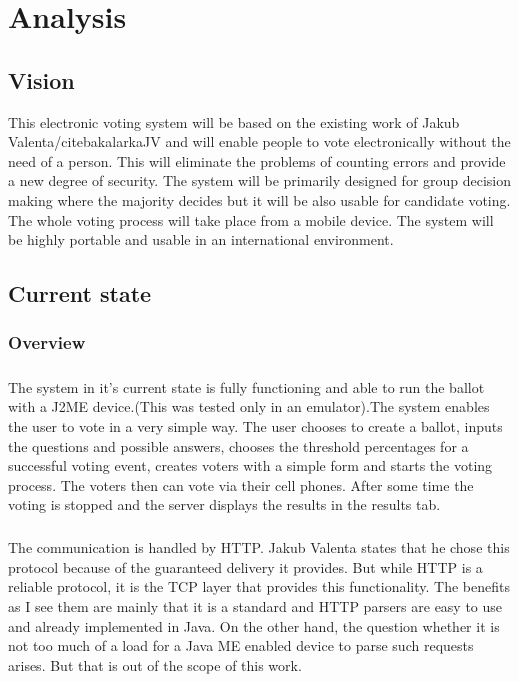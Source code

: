 \documentclass[11pt,twoside,a4paper]{book}
\begin{document}
\chapter{Analysis}
\section{Vision}
This electronic voting system will be based on the existing work of Jakub Valenta/cite{bakalarkaJV} and will enable people to vote electronically without the need of a person. This will eliminate the problems of counting errors and provide a new degree of security. The system will be primarily designed for group decision making where the majority decides but it will be also usable for candidate voting. The whole voting process will take place from a mobile device. The system will be highly portable and usable in an international environment.
\section{Current state}
\subsection{Overview}
\paragraph{}
The system in it's current state is fully functioning and able to run the ballot with a J2ME device.(This was tested only in an emulator).The system enables the user to vote in a very simple way. The user chooses to create a ballot, inputs the questions and possible answers, chooses the threshold percentages for a successful voting event, creates voters with a simple form and starts the voting process. The voters then can vote via their cell phones. After some time the voting is stopped and the server displays the results in the results tab. \paragraph{}
The communication is handled by HTTP. Jakub Valenta\cite{bakalarkaJV} states that he chose this protocol because of the guaranteed delivery it provides. But while HTTP is a reliable protocol, it is the TCP layer that provides this functionality. The benefits as I see them are mainly that it is a standard and HTTP parsers are easy to use and already implemented in Java. On the other hand, the question whether it is not too much of a load for a Java ME enabled device to parse such requests arises. But that is out of the scope of this work.
\end{document}
